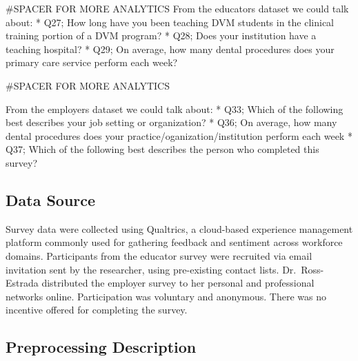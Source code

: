 \documentclass[
  11pt,
  letterpaper,
  DIV=11,
  numbers=noendperiod]{scrartcl}
\newenvironment{Shaded}{\begin{snugshade}}{\end{snugshade}}
\newcommand{\CommentTok}[1]{\textcolor[rgb]{0.37,0.37,0.37}{#1}}
\newcommand{\ControlFlowTok}[1]{\textcolor[rgb]{0.00,0.23,0.31}{#1}}
\newcommand{\ErrorTok}[1]{\textcolor[rgb]{0.68,0.00,0.00}{#1}}
\newcommand{\NormalTok}[1]{\textcolor[rgb]{0.00,0.23,0.31}{#1}}
\newcommand{\SpecialCharTok}[1]{\textcolor[rgb]{0.37,0.37,0.37}{#1}}
\begin{document}
\begin{Shaded}
\begin{Highlighting}[]
\CommentTok{\#SPACER FOR MORE ANALYTICS}
\NormalTok{From the educators dataset we could talk about}\SpecialCharTok{:}
\ErrorTok{*}\NormalTok{ Q27; How long have you been teaching DVM students }\ControlFlowTok{in}\NormalTok{ the clinical training portion of a DVM program?}
\SpecialCharTok{*}\NormalTok{ Q28; Does your institution have a teaching hospital?}
\SpecialCharTok{*}\NormalTok{ Q29; On average, how many dental procedures does your primary care service perform each week?}
\end{Highlighting}
\end{Shaded}

\begin{Shaded}
\begin{Highlighting}[]
\CommentTok{\#SPACER FOR MORE ANALYTICS}

\NormalTok{From the employers dataset we could talk about}\SpecialCharTok{:}
\ErrorTok{*}\NormalTok{ Q33; Which of the following best describes your job setting or organization?}
\SpecialCharTok{*}\NormalTok{ Q36; On average, how many dental procedures does your practice}\SpecialCharTok{/}\NormalTok{oganization}\SpecialCharTok{/}\NormalTok{institution perform each week}
\SpecialCharTok{*}\NormalTok{ Q37; Which of the following best describes the person who completed this survey?}
\end{Highlighting}
\end{Shaded}

\hypertarget{data-source}{%
\subsection{Data Source}\label{data-source}}

Survey data were collected using Qualtrics, a cloud-based experience
management platform commonly used for gathering feedback and sentiment
across workforce domains. Participants from the educator survey were
recruited via email invitation sent by the researcher, using
pre-existing contact lists. Dr.~Ross-Estrada distributed the employer
survey to her personal and professional networks online. Participation
was voluntary and anonymous. There was no incentive offered for
completing the survey.

\hypertarget{preprocessing-description}{%
\subsection{Preprocessing Description}\label{preprocessing-description}}
\end{document}
